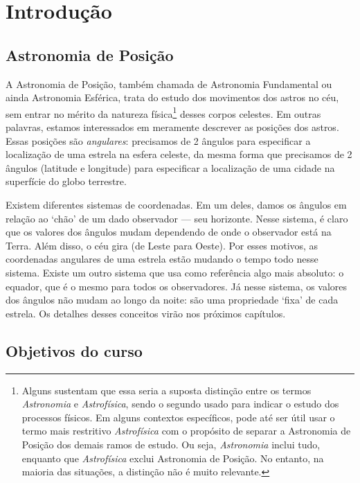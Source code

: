 \chapter{Introdução}
\label{cap01}

\section{Astronomia de Posição}

A Astronomia de Posição, também chamada de Astronomia Fundamental ou ainda Astronomia Esférica, trata do estudo dos movimentos dos astros no céu, sem entrar no mérito da natureza física\footnote{Alguns sustentam que essa seria a suposta distinção entre os termos \textit{Astronomia} e \textit{Astrofísica}, sendo o segundo usado para indicar o estudo dos processos físicos. Em alguns contextos específicos, pode até ser útil usar o termo mais restritivo \textit{Astrofísica} com o propósito de separar a Astronomia de Posição dos demais ramos de estudo. Ou seja, \textit{Astronomia} inclui tudo, enquanto que \textit{Astrofísica} exclui Astronomia de Posição. No entanto, na maioria das situações, a distinção não é muito relevante.} desses corpos celestes. Em outras palavras, estamos interessados em meramente descrever as posições dos astros. Essas posições são \textit{angulares}: precisamos de 2 ângulos para especificar a localização de uma estrela na esfera celeste, da mesma forma que precisamos de 2 ângulos (latitude e longitude) para especificar a localização de uma cidade na superfície do globo terrestre.

Existem diferentes sistemas de coordenadas. Em um deles, damos os ângulos em relação ao `chão' de um dado observador --- seu horizonte. Nesse sistema, é claro que os valores dos ângulos mudam dependendo de onde o observador está na Terra. Além disso, o céu gira (de Leste para Oeste). Por esses motivos, as coordenadas angulares de uma estrela estão mudando o tempo todo nesse sistema. Existe um outro sistema que usa como referência algo mais absoluto: o equador, que é o mesmo para todos os observadores. Já nesse sistema, os valores dos ângulos não mudam ao longo da noite: são uma propriedade `fixa' de cada estrela. Os detalhes desses conceitos virão nos próximos capítulos.

\section{Objetivos do curso}

